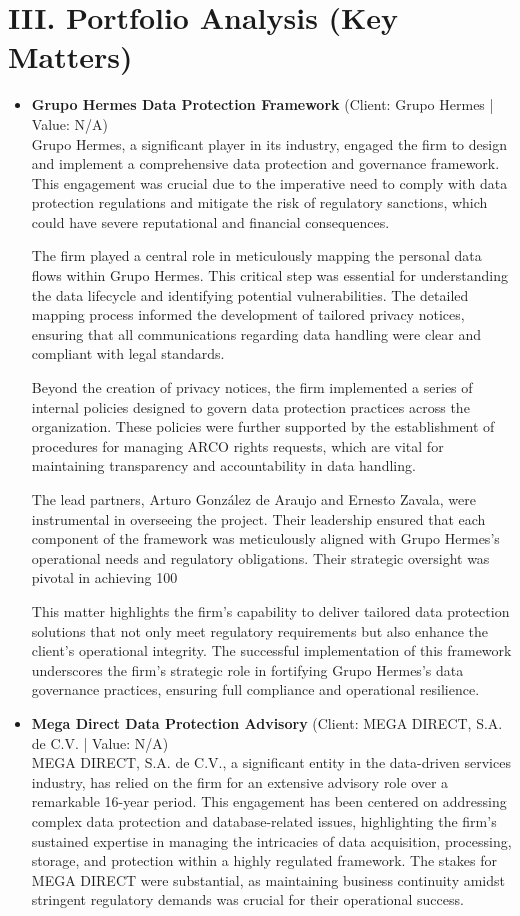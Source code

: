 \documentclass[11pt]{article}
\begin{document}
\section*{III. Portfolio Analysis (Key Matters)}
\begin{itemize}
\item \textbf{Grupo Hermes Data Protection Framework} (Client: Grupo Hermes | Value: N/A)\\ Grupo Hermes, a significant player in its industry, engaged the firm to design and implement a comprehensive data protection and governance framework. This engagement was crucial due to the imperative need to comply with data protection regulations and mitigate the risk of regulatory sanctions, which could have severe reputational and financial consequences. 

The firm played a central role in meticulously mapping the personal data flows within Grupo Hermes. This critical step was essential for understanding the data lifecycle and identifying potential vulnerabilities. The detailed mapping process informed the development of tailored privacy notices, ensuring that all communications regarding data handling were clear and compliant with legal standards. 

Beyond the creation of privacy notices, the firm implemented a series of internal policies designed to govern data protection practices across the organization. These policies were further supported by the establishment of procedures for managing ARCO rights requests, which are vital for maintaining transparency and accountability in data handling. 

The lead partners, Arturo González de Araujo and Ernesto Zavala, were instrumental in overseeing the project. Their leadership ensured that each component of the framework was meticulously aligned with Grupo Hermes's operational needs and regulatory obligations. Their strategic oversight was pivotal in achieving 100%

This matter highlights the firm's capability to deliver tailored data protection solutions that not only meet regulatory requirements but also enhance the client's operational integrity. The successful implementation of this framework underscores the firm's strategic role in fortifying Grupo Hermes's data governance practices, ensuring full compliance and operational resilience.
\item \textbf{Mega Direct Data Protection Advisory} (Client: MEGA DIRECT, S.A. de C.V. | Value: N/A)\\ MEGA DIRECT, S.A. de C.V., a significant entity in the data-driven services industry, has relied on the firm for an extensive advisory role over a remarkable 16-year period. This engagement has been centered on addressing complex data protection and database-related issues, highlighting the firm's sustained expertise in managing the intricacies of data acquisition, processing, storage, and protection within a highly regulated framework. The stakes for MEGA DIRECT were substantial, as maintaining business continuity amidst stringent regulatory demands was crucial for their operational success.


\end{itemize}
\end{document}
